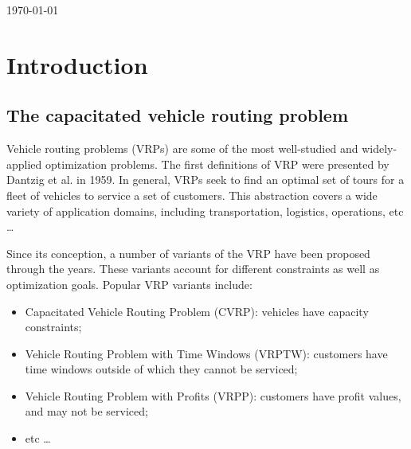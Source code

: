 \documentclass[12pt]{report}
\begin{document}
\begin{titlepage}


	\vfill\vfill\vfill %

	{\large\today} %

	\vfill %
\end{titlepage}

\tableofcontents
\pagebreak

\setcounter{page}{1}

\chapter{Introduction}
\section{The capacitated vehicle routing problem}
Vehicle routing problems (VRPs) are some of the most well-studied and widely-applied optimization problems. The first definitions of VRP were presented by Dantzig et al. \cite{dantzig1959truck} in 1959. In general, VRPs seek to find an optimal set of tours for a fleet of vehicles to service a set of customers. This abstraction covers a wide variety of application domains, including transportation, logistics, operations, etc \dots

Since its conception, a number of variants of the VRP have been proposed through the years. These variants account for different constraints as well as optimization goals. Popular VRP variants include:
\begin{itemize}
	\item Capacitated Vehicle Routing Problem (CVRP): vehicles have capacity constraints;
	\item Vehicle Routing Problem with Time Windows (VRPTW): customers have time windows outside of which they cannot be serviced;
	\item Vehicle Routing Problem with Profits (VRPP): customers have profit values, and may not be serviced;
	\item etc \dots
\end{itemize}
\end{document}

